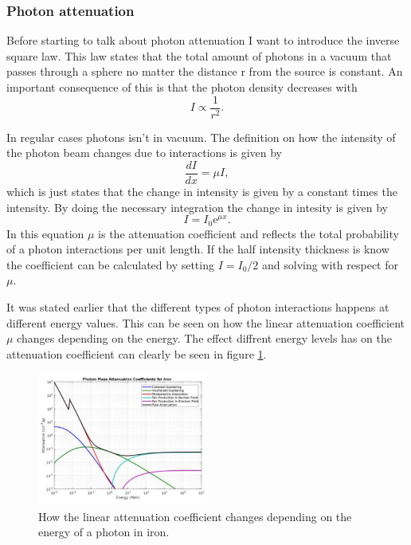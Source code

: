 \documentclass[jmp, amsmath, amssymb, reprint]{article}
\numberwithin{equation}{section}
\newcommand{\e}{\mathrm{e}}
\begin{document}
\begin{multicols}{2}
\subsubsection{Photon attenuation}

Before starting to talk about photon attenuation I want to introduce the inverse square law. This law states that the total amount of photons in a vacuum that passes through a sphere no matter the distance r from the source is constant. An important consequence of this is that the photon density decreases with
\begin{equation}
I\propto \frac{1}{r^2}.
\end{equation}

In regular cases photons isn't in vacuum. The definition on how the intensity of the photon beam changes due to interactions is given by
\begin{equation}
\frac{dI}{dx}=\mu I,
\end{equation}
which is just states that the change in intensity is given by a constant times the intensity. By doing the necessary integration the change in intesity is given by
\begin{equation}
I=I_0\e^{\mu x}.
\end{equation}
In this equation \(\mu\) is the attenuation coefficient and reflects the total probability of a photon interactions per unit length. If the half intensity thickness is know the coefficient can be calculated by setting \(I=I_0/2\) and solving with respect for \(\mu\).

It was stated earlier that the different types of photon interactions happens at different energy values. This can be seen on how the linear attenuation coefficient \(\mu\) changes depending on the energy. The effect diffrent energy levels has on the attenuation coefficient can clearly be seen in figure \ref{fig:lac}.

\begin{figure}[H]
	\centering
  	\includegraphics[width=0.50\textwidth]{lac.png}
	\caption{How the linear attenuation coefficient changes depending on the energy of a photon in iron.}
	\label{fig:lac}
\end{figure}


\end{multicols}
\end{document}

